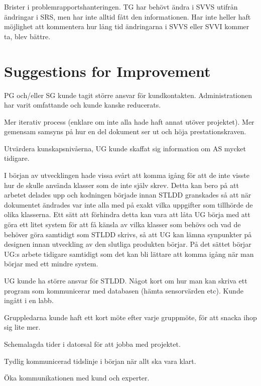 \documentclass[a4paper]{article}
\begin{document}
Brister i problemrapportshanteringen. TG har behövt ändra i SVVS utifrån ändringar i SRS, men har inte alltid fått den informationen. Har inte heller haft möjlighet att kommentera hur lång tid ändringarna i SVVS eller SVVI kommer ta, blev bättre.


\section{Suggestions for Improvement}

PG och/eller SG kunde tagit större ansvar för kundkontakten. Administrationen har varit omfattande och kunde kanske reducerats.

Mer iterativ process (enklare om inte alla hade haft annat utöver projektet). Mer gemensam samsyns på hur en del dokument ser ut och höja prestationskraven.

Utvärdera kunskapsnivåerna, UG kunde skaffat sig information om AS mycket tidigare.

I början av utvecklingen hade vissa svårt att komma igång för att de inte visste hur de skulle använda klasser som de inte själv skrev. Detta kan bero på att arbetet delades upp och kodningen började innan STLDD granskades så att när dokumentet ändrades var inte alla med på exakt vilka uppgifter som tillhörde de olika klasserna. Ett sätt att förhindra detta kan vara att låta UG börja med att göra ett litet system för att få känsla av vilka klasser som behövs och vad de behöver göra samtidigt som STLDD skrivs, så att UG kan lämna synpunkter på designen innan utveckling av den slutliga produkten börjar. På det sättet börjar UG:s arbete tidigare samtidigt som det kan bli lättare att komma igång när man börjar med ett mindre system.


UG kunde ha större ansvar för STLDD. Något kort om hur man kan skriva ett program som kommunicerar med databasen (hämta sensorvärden etc). Kunde ingått i en labb.

Gruppledarna kunde haft ett kort möte efter varje gruppmöte, för att snacka ihop sig lite mer. 

Schemalagda tider i datorsal för att jobba med projektet.

Tydlig kommunicerad tidslinje i början när allt ska vara klart.

Öka kommunikationen med kund och experter.
\end{document}
